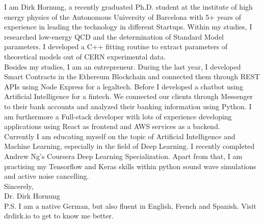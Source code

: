 \documentclass[11pt]{article}
\begin{document}
 \noindent I am Dirk Hornung, a recently graduated Ph.D. student at the institute
 of high energy physics of the Autonomous University of Barcelona with 5+ years
 of experience in leading the technology in different Startups. Within my
 studies, I researched low-energy QCD and the determination of Standard Model
 parameters. I developed a C++ fitting routine to extract parameters of
 theoretical models out of CERN experimental data. \\

 \noindent Besides my studies, I am an entrepreneur. During the last year, I
 developed Smart Contracts in the Ethereum Blockchain and connected them through
 REST APIs using Node Express for a legaltech. Before I developed a chatbot using
 Artificial Intelligence for a fintech. We connected our clients through
 Messenger to their bank accounts and analyzed their banking information using
 Python. I am furthermore a Full-stack developer with lots of experience
 developing
 applications using React as frontend and AWS services as a backend.  \\

 \noindent Currently I am educating myself on the topic of Artificial Intelligence
 and Machine Learning, especially in the field of Deep Learning. I recently completed
 Andrew Ng's Coursera Deep Learning Specialization. Apart from that, I am practising my
 Tensorflow and Keras skills within python sound wave simulations and active noise cancelling.\\

 \noindent Sincerely, \\
 Dr. Dirk Hornung \\

 \noindent P.S. I am a native German, but also fluent in English, French and
 Spanish. Visit drdirk.io to get to know me better.
\end{document}
